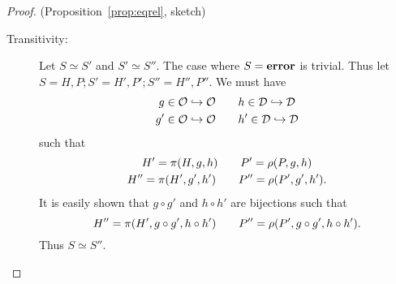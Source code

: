 \begin{proof}{(Proposition~\ref{prop:eqrel}, sketch)}
\begin{description}
    \item[Transitivity:] Let $S \simeq S'$ and $S' \simeq S''$. The case where
      $S = \mbox{{\bf error}}$ is trivial. Thus let $S = H,P; S' = H',P'; S'' = H'', P''$.
      We must have
      \begin{equation*}
        \begin{gathered}
          g\in \mathcal{O} \hookrightarrow \mathcal{O} \quad\quad h\in \mathcal{D}
          \hookrightarrow \mathcal{D} \\
          g'\in \mathcal{O} \hookrightarrow \mathcal{O} \quad\quad h'\in \mathcal{D}
          \hookrightarrow \mathcal{D}
        \end{gathered}
      \end{equation*}
      such that
      \begin{equation*}
        \begin{gathered}
          H' = \pi(H, g, h) \quad\quad P' = \rho(P, g, h)  \\
          H'' = \pi(H', g', h') \quad\quad P'' = \rho(P', g', h').
        \end{gathered}
      \end{equation*}
      It is easily shown that $g \circ g'$ and $h \circ h'$ are bijections such
      that 
      \begin{equation*}
        H'' = \pi(H', g \circ g', h \circ h') \quad\quad P'' = \rho(P', g \circ
        g', h \circ h').
      \end{equation*}
      Thus $S \simeq S''$.
  \end{description}
\end{proof}

